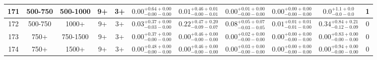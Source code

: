 \documentclass[11pt, oneside]{article}
\begin{document}
\begin{table}
{\begin{tabular}{ |c|c|c|c|c||c|c|c|c||c|c| }
171 & 500-750 & 500-1000 & 9+ & 3+ & $0.00^{+0.64+0.00}_{-0.00-0.00}$ & $0.01^{+0.46+0.01}_{-0.00-0.01}$ & $0.00^{+0.01+0.00}_{-0.00-0.00}$ & $0.00^{+0.00+0.00}_{-0.00-0.00}$ & $0.0^{+1.1+0.0}_{-0.0-0.0}$ & 1 \\ \hline
172 & 500-750 & 1000+ & 9+ & 3+ & $0.03^{+0.37+0.00}_{-0.03-0.00}$ & $0.22^{+0.47+0.20}_{-0.09-0.07}$ & $0.08^{+0.05+0.07}_{-0.03-0.05}$ & $0.01^{+0.01+0.01}_{-0.01-0.00}$ & $0.34^{+0.84+0.21}_{-0.12-0.09}$ & 0 \\ \hline
173 & 750+ & 750-1500 & 9+ & 3+ & $0.00^{+0.37+0.00}_{-0.00-0.00}$ & $0.00^{+0.46+0.00}_{-0.00-0.00}$ & $0.00^{+0.02+0.00}_{-0.00-0.00}$ & $0.00^{+0.00+0.00}_{-0.00-0.00}$ & $0.00^{+0.83+0.00}_{-0.00-0.00}$ & 0 \\ \hline
174 & 750+ & 1500+ & 9+ & 3+ & $0.00^{+0.48+0.00}_{-0.00-0.00}$ & $0.00^{+0.46+0.00}_{-0.00-0.00}$ & $0.00^{+0.03+0.00}_{-0.00-0.00}$ & $0.00^{+0.00+0.00}_{-0.00-0.00}$ & $0.00^{+0.94+0.00}_{-0.00-0.00}$ & 0 \\ \hline
\end{tabular}}
\end{table}
\end{document}
